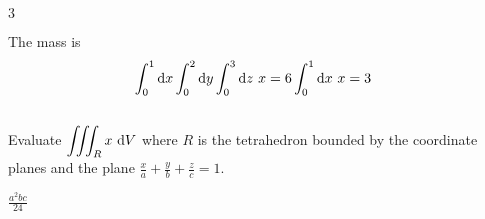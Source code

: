 \begin{answer}
$3$
\end{answer}

\begin{solution}
The mass is
\begin{align*}
\int_0^1\mathrm{d}x \int_0^2\mathrm{d}y\int_0^3\mathrm{d}z\ x
&= 6\int_0^1 \mathrm{d}x\ x =3
\end{align*}
\end{solution}


\subsection*{\Procedural}

\begin{question}
Evaluate $\displaystyle\iiint_R x\ \mathrm{d}V$ where $R$ is the tetrahedron bounded
by the coordinate planes and the plane 
$\frac{x}{a}+\frac{y}{b}+\frac{z}{c}=1$.
\end{question}

%

\begin{answer}
$\frac{a^2bc}{24}$
\end{answer}

